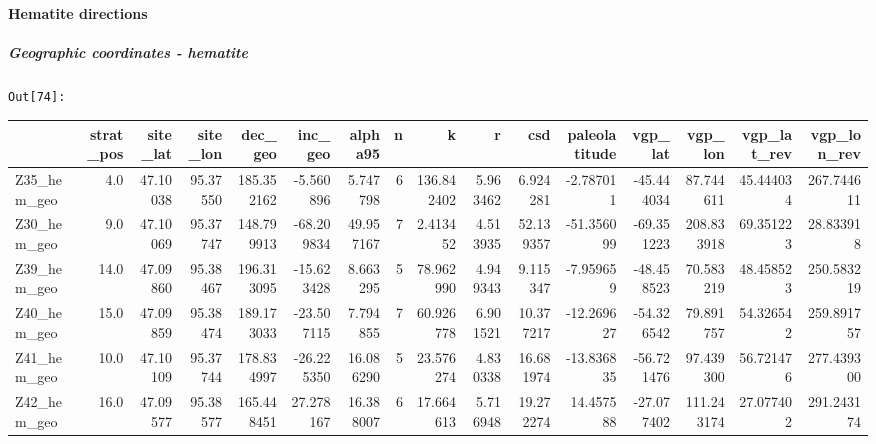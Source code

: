 \documentclass[11pt]{article}
\begin{document}
    \begin{center}
    \end{center}
    { \hspace*{\fill} \\}
    
    \paragraph{Hematite directions}\label{hematite-directions}

    \subparagraph{Geographic coordinates -
hematite}\label{geographic-coordinates---hematite}

\texttt{\color{outcolor}Out[{\color{outcolor}74}]:}
    \begin{sidewaystable}
    {\tiny\begin{tabular}{lrrrrrrrrrrrrrrr}
\toprule
{} &  strat\_pos &  site\_lat &  site\_lon &     dec\_geo &    inc\_geo &    alpha95 &  n &           k &         r &        csd &  paleolatitude &    vgp\_lat &     vgp\_lon &  vgp\_lat\_rev &  vgp\_lon\_rev \\
\midrule
Z35\_hem\_geo &        4.0 &  47.10038 &  95.37550 &  185.352162 &  -5.560896 &   5.747798 &  6 &  136.842402 &  5.963462 &   6.924281 &      -2.787011 & -45.444034 &   87.744611 &    45.444034 &   267.744611 \\
Z30\_hem\_geo &        9.0 &  47.10069 &  95.37747 &  148.799913 & -68.209834 &  49.957167 &  7 &    2.413452 &  4.513935 &  52.139357 &     -51.356099 & -69.351223 &  208.833918 &    69.351223 &    28.833918 \\
Z39\_hem\_geo &       14.0 &  47.09860 &  95.38467 &  196.313095 & -15.623428 &   8.663295 &  5 &   78.962990 &  4.949343 &   9.115347 &      -7.959659 & -48.458523 &   70.583219 &    48.458523 &   250.583219 \\
Z40\_hem\_geo &       15.0 &  47.09859 &  95.38474 &  189.173033 & -23.507115 &   7.794855 &  7 &   60.926778 &  6.901521 &  10.377217 &     -12.269627 & -54.326542 &   79.891757 &    54.326542 &   259.891757 \\
Z41\_hem\_geo &       10.0 &  47.10109 &  95.37744 &  178.834997 & -26.225350 &  16.086290 &  5 &   23.576274 &  4.830338 &  16.681974 &     -13.836835 & -56.721476 &   97.439300 &    56.721476 &   277.439300 \\
Z42\_hem\_geo &       16.0 &  47.09577 &  95.38577 &  165.448451 &  27.278167 &  16.388007 &  6 &   17.664613 &  5.716948 &  19.272274 &      14.457588 & -27.077402 &  111.243174 &    27.077402 &   291.243174 \\

\end{tabular}}
\end{sidewaystable}
\end{document}
